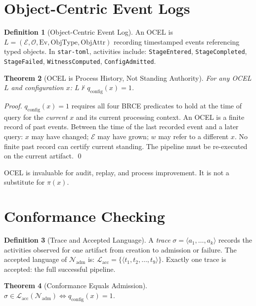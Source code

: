 \documentclass[12pt, letterpaper]{report}
\theoremstyle{plain}
\newtheorem{theorem}{Theorem}[chapter]
\theoremstyle{definition}
\newtheorem{definition}[theorem]{Definition}
\theoremstyle{remark}
\newcommand{\EE}{\mathcal{E}}
\newcommand{\NN}{\mathcal{N}}
\newcommand{\qc}{q_{\mathrm{config}}}
\begin{document}
\section{Object-Centric Event Logs}
\label{sec:ocel}

\begin{definition}[Object-Centric Event Log]
\label{def:ocel}
An OCEL is $L = (\mathcal{E}, \mathcal{O}, \mathrm{Ev}, \mathrm{ObjType},
\mathrm{ObjAttr})$ recording timestamped events referencing typed objects.
In \texttt{star-toml}, activities include: \texttt{StageEntered},
\texttt{StageCompleted}, \texttt{StageFailed}, \texttt{WitnessComputed},
\texttt{ConfigAdmitted}.
\end{definition}

\begin{theorem}[OCEL is Process History, Not Standing Authority]
\label{thm:ocel}
For any OCEL $L$ and configuration $x$: $L \not\vdash \qc(x) = 1$.
\end{theorem}

\begin{proof}
$\qc(x) = 1$ requires all four BRCE predicates to hold at the time of
query for the \emph{current} $x$ and its current processing context.
An OCEL is a finite record of past events.
Between the time of the last recorded event and a later query:
$x$ may have changed; $\EE$ may have grown; $w$ may refer to a different $x$.
No finite past record can certify current standing.
The pipeline must be re-executed on the current artifact. \qed
\end{proof}

OCEL is invaluable for audit, replay, and process improvement.
It is not a substitute for $\pi(x)$.

\section{Conformance Checking}

\begin{definition}[Trace and Accepted Language]
A \emph{trace} $\sigma = \langle a_1, \ldots, a_k\rangle$ records the
activities observed for one artifact from creation to admission or failure.
The accepted language of $\NN_{\mathrm{adm}}$ is:
$\mathcal{L}_{\mathrm{acc}} = \{\langle t_1, t_2, \ldots, t_9\rangle\}$.
Exactly one trace is accepted: the full successful pipeline.
\end{definition}

\begin{theorem}[Conformance Equals Admission]
\label{thm:conformance}
$\sigma \in \mathcal{L}_{\mathrm{acc}}(\NN_{\mathrm{adm}}) \iff \qc(x) = 1$.
\end{theorem}
\end{document}
